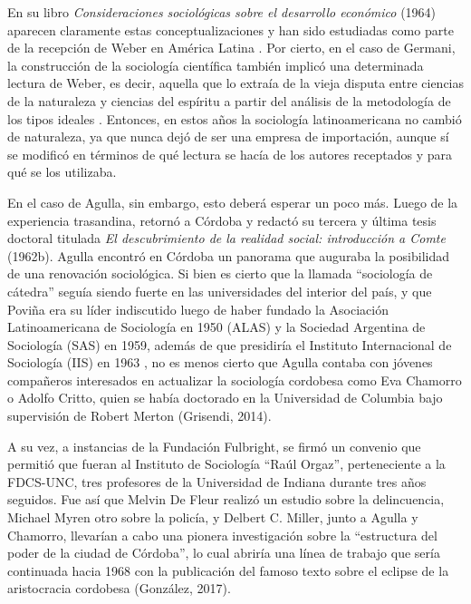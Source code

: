 En su libro \emph{Consideraciones sociológicas sobre el desarrollo económico} (1964) aparecen claramente estas conceptualizaciones y han sido estudiadas como parte de la recepción de Weber en América Latina \parencite{1541-PEON1998}. Por cierto, en el caso de Germani, la construcción de la sociología científica también implicó una determinada lectura de Weber, es decir, aquella que lo extraía de la vieja disputa entre ciencias de la naturaleza y ciencias del espíritu a partir del análisis de la metodología de los tipos ideales \parencite{1566-BLANCO2007}. Entonces, en estos años la sociología latinoamericana no cambió de naturaleza, ya que nunca dejó de ser una empresa de importación, aunque sí se modificó en términos de qué lectura se hacía de los autores receptados y para qué se los utilizaba.

En el caso de Agulla, sin embargo, esto deberá esperar un poco más. Luego de la experiencia trasandina, retornó a Córdoba y redactó su tercera y última tesis doctoral titulada \emph{El descubrimiento de la realidad social: introducción a Comte} (1962b). Agulla encontró en Córdoba un panorama que auguraba la posibilidad de una renovación sociológica. Si bien es cierto que la llamada \enquote{sociología de cátedra} seguía siendo fuerte en las universidades del interior del país, y que Poviña era su líder indiscutido luego de haber fundado la Asociación Latinoamericana de Sociología en 1950 (ALAS) y la Sociedad Argentina de Sociología (SAS) en 1959, además de que presidiría el Instituto Internacional de Sociología (IIS) en 1963 \parencite{1615-DIAZ2013}, no es menos cierto que Agulla contaba con jóvenes compañeros interesados en actualizar la sociología cordobesa como Eva Chamorro o Adolfo Critto, quien se había doctorado en la Universidad de Columbia bajo supervisión de Robert Merton (Grisendi, 2014).

A su vez, a instancias de la Fundación Fulbright, se firmó un convenio que permitió que fueran al Instituto de Sociología \enquote{Raúl Orgaz}, perteneciente a la FDCS-UNC, tres profesores de la Universidad de Indiana durante tres años seguidos. Fue así que Melvin De Fleur realizó un estudio sobre la delincuencia, Michael Myren otro sobre la policía, y Delbert C. Miller, junto a Agulla y Chamorro, llevarían a cabo una pionera investigación sobre la \enquote{estructura del poder de la ciudad de Córdoba}, lo cual abriría una línea de trabajo que sería continuada hacia 1968 con la publicación del famoso texto sobre el eclipse de la aristocracia cordobesa (González, 2017).

